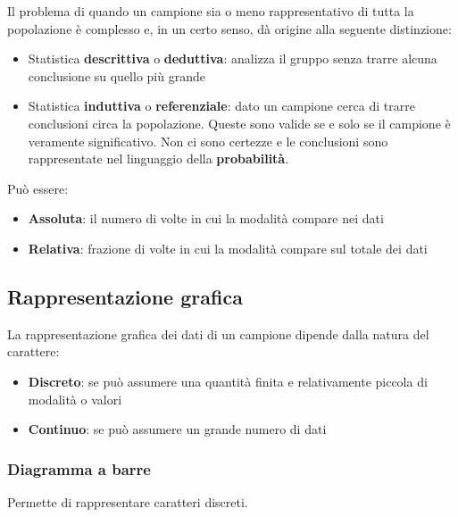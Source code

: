 \begin{observation}
	Il problema di quando un campione sia o meno rappresentativo di tutta la popolazione è complesso e, in un certo senso, dà origine alla seguente distinzione:
	\begin{itemize}
		\item Statistica \textbf{descrittiva} o \textbf{deduttiva}: analizza il gruppo senza trarre alcuna conclusione su quello più grande
		\item Statistica \textbf{induttiva} o \textbf{referenziale}: dato un campione cerca di trarre conclusioni circa la popolazione. Queste sono valide se e solo se il campione è veramente significativo. Non ci sono certezze e le conclusioni sono rappresentate nel linguaggio della \textbf{probabilità}.
	\end{itemize}
\end{observation}
\begin{definition}
	Può essere:
	\begin{itemize}
		\item \textbf{Assoluta}: il numero di volte in cui la modalità compare nei dati
		\item \textbf{Relativa}: frazione di volte in cui la modalità compare sul totale dei dati
	\end{itemize}
\end{definition}

\subsection{Rappresentazione grafica}
La rappresentazione grafica dei dati di un campione dipende dalla natura del carattere:
\begin{itemize}
	\item \textbf{Discreto}: se può assumere una quantità finita e relativamente piccola di modalità o valori
	\item \textbf{Continuo}: se può assumere un grande numero di dati
\end{itemize}

\subsubsection{Diagramma a barre}
Permette di rappresentare caratteri discreti.
\begin{center}
\end{center}


